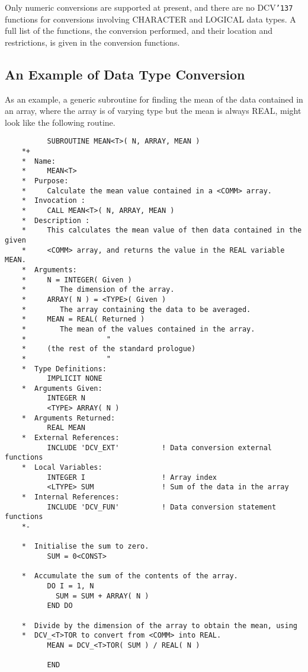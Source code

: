 \documentclass[twoside,11pt]{article}
\renewcommand{\_}{{\tt\char'137}}     %
\newcommand{\htmlref}[2]{#1}
\newcommand{\latexelsehtml}[2]{#1}
\renewcommand{\latexelsehtml}[2]{#2}
\begin{document}
Only numeric conversions are supported at present, and
there are no DCV\_ functions for conversions involving CHARACTER and
LOGICAL data types.
A full list of the functions, the conversion performed, and their
location and restrictions, is given in 
\latexelsehtml{Appendix~\ref{ap_b}}{the
\htmlref{conversion functions}{ap_b}}.

\subsection{An Example of Data Type Conversion}

As an example, a generic subroutine for finding the mean of the data
contained in an array, where the array is of varying type but the mean is
always REAL, might look like the following routine.

\begin{verbatim}
          SUBROUTINE MEAN<T>( N, ARRAY, MEAN )
    *+
    *  Name:
    *     MEAN<T>
    *  Purpose:
    *     Calculate the mean value contained in a <COMM> array.
    *  Invocation :
    *     CALL MEAN<T>( N, ARRAY, MEAN )
    *  Description :
    *     This calculates the mean value of then data contained in the given
    *     <COMM> array, and returns the value in the REAL variable MEAN.
    *  Arguments:
    *     N = INTEGER( Given )
    *        The dimension of the array.
    *     ARRAY( N ) = <TYPE>( Given )
    *        The array containing the data to be averaged.
    *     MEAN = REAL( Returned )
    *        The mean of the values contained in the array.
    *                   "
    *     (the rest of the standard prologue)
    *                   "
    *  Type Definitions:
          IMPLICIT NONE
    *  Arguments Given:
          INTEGER N
          <TYPE> ARRAY( N )
    *  Arguments Returned:
          REAL MEAN
    *  External References:
          INCLUDE 'DCV_EXT'          ! Data conversion external functions
    *  Local Variables:
          INTEGER I                  ! Array index
          <LTYPE> SUM                ! Sum of the data in the array
    *  Internal References:
          INCLUDE 'DCV_FUN'          ! Data conversion statement functions
    *-
      
    *  Initialise the sum to zero.
          SUM = 0<CONST>
      
    *  Accumulate the sum of the contents of the array.
          DO I = 1, N
            SUM = SUM + ARRAY( N )
          END DO
      
    *  Divide by the dimension of the array to obtain the mean, using
    *  DCV_<T>TOR to convert from <COMM> into REAL.
          MEAN = DCV_<T>TOR( SUM ) / REAL( N )

          END
\end{verbatim}
\end{document}
